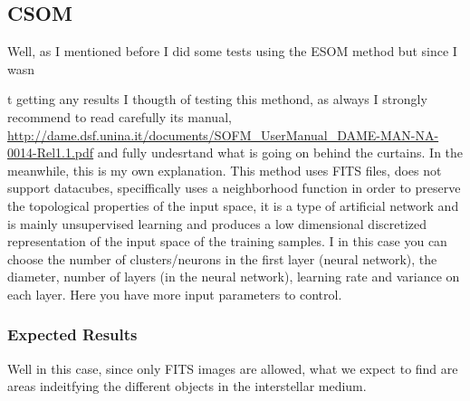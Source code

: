 \documentclass[11pt,fleqn]{book} %
\begin{document}
																																																																																																																																																																																																																																																																																																	     \subsection{CSOM}
																																																																																																																																																																																																																																																																																																	     Well, as I mentioned before I did some tests using the ESOM method but since I wasn{t getting any results I thougth of testing this methond, as always I strongly recommend to read carefully its manual, \url{http://dame.dsf.unina.it/documents/SOFM_UserManual_DAME-MAN-NA-0014-Rel1.1.pdf} and fully undesrtand what is going on behind the curtains. In the meanwhile, this is my own explanation. This method uses FITS files, does not support datacubes, speciffically uses a neighborhood function in order to preserve the topological properties of the input space, it is a type of artificial network and is mainly unsupervised learning  and produces a low dimensional discretized representation of the input space of the training samples. I in this case you can choose the number of clusters/neurons in the first layer (neural network), the diameter, number of layers (in the neural network), learning rate and variance  on each layer. Here you have more input parameters to control.
																																																																																																																																																																																																																																																																																																	     \subsubsection{Expected Results}
																																																																																																																																																																																																																																																																																																	     Well in this case, since only FITS images are allowed, what we expect to find are areas indeitfying the different objects in the interstellar medium.

}
\end{document}
